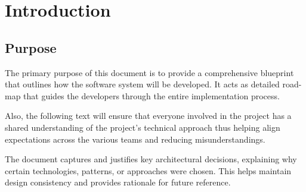 \chapter{Introduction}
\label{chap:Introduction}%

\section{Purpose}
\label{sec:Purpose}%

\par The primary purpose of this document is to provide a comprehensive blueprint that outlines how the software system 
will be developed. It acts as detailed road-map that guides the developers through the entire implementation process.

\par Also, the following text will ensure that everyone involved in the project has a shared understanding of the 
project's technical approach thus helping align expectations across the various teams and reducing misunderstandings.

\par The document captures and justifies key architectural decisions, explaining why certain technologies, patterns, or 
approaches were chosen. This helps maintain design consistency and provides rationale for future reference.
